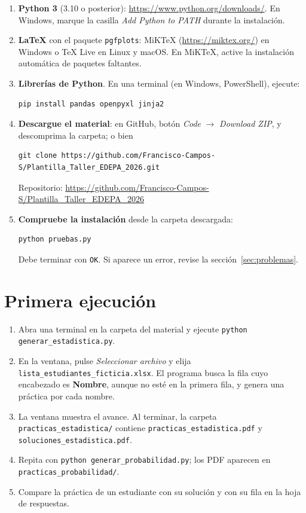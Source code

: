 \documentclass[11pt]{article}
\newcommand{\cod}[1]{\texttt{#1}}
\begin{document}
\begin{enumerate}[leftmargin=*]
\item \textbf{Python 3} (3.10 o posterior): \url{https://www.python.org/downloads/}. En Windows, marque la casilla \emph{Add Python to PATH} durante la instalación.
\item \textbf{\LaTeX} con el paquete \cod{pgfplots}: MiKTeX (\url{https://miktex.org/}) en Windows o TeX Live en Linux y macOS. En MiKTeX, active la instalación automática de paquetes faltantes.
\item \textbf{Librerías de Python}. En una terminal (en Windows, PowerShell), ejecute:
\begin{lstlisting}
pip install pandas openpyxl jinja2
\end{lstlisting}
\item \textbf{Descargue el material}: en GitHub, botón \emph{Code} $\rightarrow$ \emph{Download ZIP}, y descomprima la carpeta; o bien
\begin{lstlisting}
git clone https://github.com/Francisco-Campos-S/Plantilla_Taller_EDEPA_2026.git
\end{lstlisting}
Repositorio: \url{https://github.com/Francisco-Campos-S/Plantilla_Taller_EDEPA_2026}
\item \textbf{Compruebe la instalación} desde la carpeta descargada:
\begin{lstlisting}
python pruebas.py
\end{lstlisting}
Debe terminar con \cod{OK}. Si aparece un error, revise la sección~\ref{sec:problemas}.
\end{enumerate}

\section{Primera ejecución}

\begin{enumerate}[leftmargin=*]
\item Abra una terminal en la carpeta del material y ejecute \cod{python generar\_estadistica.py}.
\item En la ventana, pulse \emph{Seleccionar archivo} y elija \cod{lista\_estudiantes\_ficticia.xlsx}. El programa busca la fila cuyo encabezado es \textbf{Nombre}, aunque no esté en la primera fila, y genera una práctica por cada nombre.
\item La ventana muestra el avance. Al terminar, la carpeta \cod{practicas\_estadistica/} contiene \cod{practicas\_estadistica.pdf} y \cod{soluciones\_estadistica.pdf}.
\item Repita con \cod{python generar\_probabilidad.py}; los PDF aparecen en \cod{practicas\_probabilidad/}.
\item Compare la práctica de un estudiante con su solución y con su fila en la hoja de respuestas.
\end{enumerate}
\end{document}
